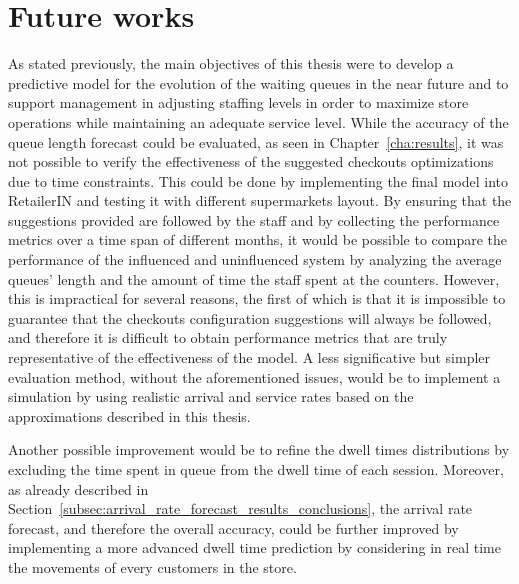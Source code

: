 \section{Future works}
\label{sec:future_works}

As stated previously, the main objectives of this thesis were to develop a predictive model for the evolution of the waiting queues in the near future and to support management in adjusting staffing levels in order to maximize store operations while maintaining an adequate service level. While the accuracy of the queue length forecast could be evaluated, as seen in Chapter~\ref{cha:results}, it was not possible to verify the effectiveness of the suggested checkouts optimizations due to time constraints. This could be done by implementing the final model into RetailerIN and testing it with different supermarkets layout. By ensuring that the suggestions provided are followed by the staff and by collecting the performance metrics over a time span of different months, it would be possible to compare the performance of the influenced and uninfluenced system by analyzing the average queues' length and the amount of time the staff spent at the counters. However, this is impractical for several reasons, the first of which is that it is impossible to guarantee that the checkouts configuration suggestions will always be followed, and therefore it is difficult to obtain performance metrics that are  truly representative of the effectiveness of the model. A less significative but simpler evaluation method, without the aforementioned issues, would be to implement a simulation by using realistic arrival and service rates based on the approximations described in this thesis.

Another possible improvement would be to refine the dwell times distributions by excluding the time spent in queue from the dwell time of each session. Moreover, as already described in Section~\ref{subsec:arrival_rate_forecast_results_conclusions}, the arrival rate forecast, and therefore the overall accuracy, could be further improved by implementing a more advanced dwell time prediction by considering in real time the movements of every customers in the store.

\clearpage


